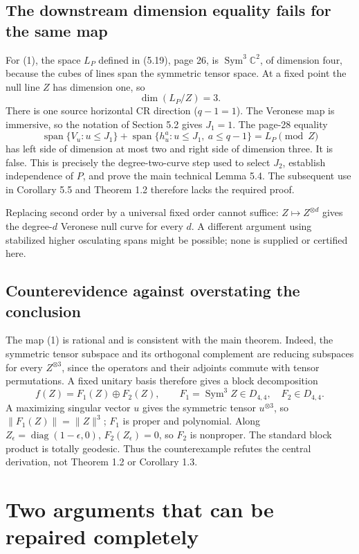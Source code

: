 \documentclass[10pt]{article}
\begin{document}
\subsection*{The downstream dimension equality fails for the same map}
For (1), the space \(L_P\) defined in (5.19), page 26, is \(\operatorname{Sym}^3\mathbb C^2\), of dimension four, because the cubes of lines span the symmetric tensor space. At a fixed point the null line \(Z\) has dimension one, so \[\dim(L_P/Z)=3.\] There is one source horizontal CR direction (\(q-1=1\)). The Veronese map is immersive, so the notation of Section 5.2 gives \(J_1=1\). The page-28 equality \[\operatorname{span}\{V_u:u\le J_1\}
 +\operatorname{span}\{h_u^a:u\le J_1,\ a\le q-1\}=L_P\pmod Z
 \tag{5}\] has left side of dimension at most two and right side of dimension three. It is false. This is precisely the degree-two-curve step used to select \(J_2\), establish independence of \(P\), and prove the main technical Lemma 5.4. The subsequent use in Corollary 5.5 and Theorem 1.2 therefore lacks the required proof.\par
Replacing second order by a universal fixed order cannot suffice: \(Z\mapsto Z^{\otimes d}\) gives the degree-\(d\) Veronese null curve for every \(d\). A different argument using stabilized higher osculating spans might be possible; none is supplied or certified here.\par
\subsection*{Counterevidence against overstating the conclusion}
The map (1) is rational and is consistent with the main theorem. Indeed, the symmetric tensor subspace and its orthogonal complement are reducing subspaces for every \(Z^{\otimes3}\), since the operators and their adjoints commute with tensor permutations. A fixed unitary basis therefore gives a block decomposition \[f(Z)=F_1(Z)\oplus F_2(Z),\qquad
 F_1=\operatorname{Sym}^3 Z\in D_{4,4},\quad F_2\in D_{4,4}.\] A maximizing singular vector \(u\) gives the symmetric tensor \(u^{\otimes3}\), so \(\|F_1(Z)\|=\|Z\|^3\); \(F_1\) is proper and polynomial. Along \(Z_\epsilon=\operatorname{diag}(1-\epsilon,0)\), \(F_2(Z_\epsilon)=0\), so \(F_2\) is nonproper. The standard block product is totally geodesic. Thus the counterexample refutes the central derivation, not Theorem 1.2 or Corollary 1.3.\par
\section*{Two arguments that can be repaired completely}
\end{document}
